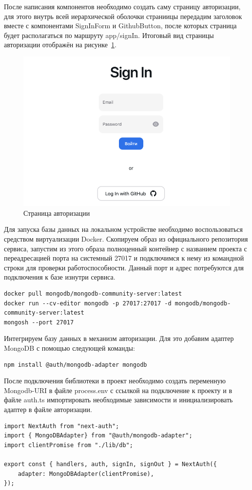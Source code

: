 \documentclass[master, och, diploma]{SCWorks}
\begin{document}
После написания компонентов необходимо создать саму страницу авторизации, для этого внутрь всей иерархической оболочки страниицы передадим заголовок вместе с компонентами SignInForm и GithubButton, после которых страница будет располагаться по маршруту app/signIn. Итоговый вид страницы авторизации отображён на рисунке~\ref{fig:24}. 
\begin{figure}[!ht]
    \centering
    \includegraphics[width=12cm]{images/image-signin.png}
    \caption{\label{fig:24}%
        Страница авторизации}
\end{figure}

Для запуска базы данных на локальном устройстве необходимо воспользоваться средством виртуализации Docker. Скопируем образ из официального репозитория сервиса, запустим из этого образа полноценный контейнер с названием проекта с переадресацией порта на системный 27017 и подключимся к нему из командной строки для проверки работоспособности. Данный порт и адрес потребуются для подключения к базе изнутри сервиса.
\begin{verbatim}
docker pull mongodb/mongodb-community-server:latest
docker run --cv-editor mongodb -p 27017:27017 -d mongodb/mongodb-community-server:latest
mongosh --port 27017
\end{verbatim}

Интегрируем базу данных в механизм авторизации. Для это добавим адаптер MongoDB с помощью следующей команды:
\begin{verbatim}
npm install @auth/mongodb-adapter mongodb
\end{verbatim}

После подключения библиотеки в проект необходимо создать переменную Mongodb-URI в файле process.env с ссылкой на подключение к проекту и в файле auth.ts импортировать необходимые зависимости и инициализировать адаптер в файле авторизации.
\begin{verbatim}
import NextAuth from "next-auth";
import { MongoDBAdapter} from "@auth/mongodb-adapter";
import clientPromise from "./lib/db";

export const { handlers, auth, signIn, signOut } = NextAuth({
    adapter: MongoDBAdapter(clientPromise),
});
\end{verbatim}
\end{document}
